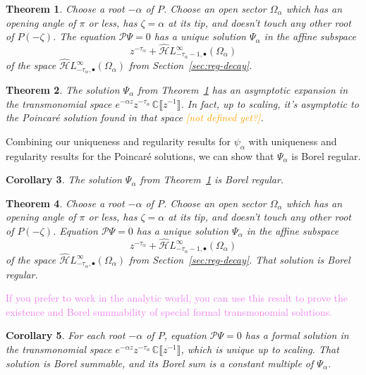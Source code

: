 \documentclass{article}
\newcommand{\dualsingexp}[2]{\widehat{\mathcal{H}}L^\infty_{#1, #2}}
\newcommand{\dualsingexpalg}[1]{\dualsingexp{#1}{\bullet}}
\newcommand{\C}{\mathbb{C}}
\theoremstyle{definition}
\theoremstyle{plain}
\newtheorem{theorem}{Theorem}[section]
\newtheorem{corollary}[theorem]{Corollary}
\begin{document}
\color{BlueViolet}
\begin{theorem}\label{thm:exist_uniq_ODE}
Choose a root $-\alpha$ of $P$. Choose an open sector $\Omega_\alpha$ which has an opening angle of $\pi$ or less, has $\zeta = \alpha$ at its tip, and doesn't touch any other root of $P(-\zeta)$. The equation $\mathcal{P}\Psi = 0$ has a unique solution $\Psi_\alpha$ in the affine subspace
\[ z^{-\tau_\alpha} + \dualsingexpalg{-\tau_\alpha-1}(\Omega_\alpha) \]
of the space $\dualsingexpalg{-\tau_\alpha}(\Omega_\alpha)$ from Section~\ref{sec:reg-decay}.
\end{theorem}
\begin{theorem}\label{thm:has_ae_ODE}
The solution $\Psi_\alpha$ from Theorem~\ref{thm:exist_uniq_ODE} has an asymptotic expansion in the transmonomial space $e^{-\alpha z} z^{-\tau_\alpha}\,\C \llbracket z^{-1} \rrbracket$. In fact, up to scaling, it's asymptotic to the Poincar\'{e} solution found in that space \textcolor{orange}{[not defined yet?]}.
\end{theorem}
Combining our uniqueness and regularity results for $\psi_\alpha$ with uniqueness and regularity results for the Poincar\'{e} solutions, we can show that $\Psi_\alpha$ is Borel regular.
\begin{corollary}
The solution $\Psi_\alpha$ from Theorem~\ref{thm:exist_uniq_ODE} is Borel regular.
\end{corollary}
\color{black}
\color{Maroon}
\begin{theorem}\label{thm:borel_reg_ODE}
Choose a root $-\alpha$ of $P$. Choose an open sector $\Omega_\alpha$ which has an opening angle of $\pi$ or less, has $\zeta = \alpha$ at its tip, and doesn't touch any other root of $P(-\zeta)$. Equation $\mathcal{P}\Psi=0$ has a unique solution $\Psi_\alpha$ in the affine subspace
\[ z^{-\tau_\alpha} + \dualsingexpalg{-\tau_\alpha-1}(\Omega_\alpha) \]
of the space $\dualsingexpalg{-\tau_\alpha}(\Omega_\alpha)$ from Section~\ref{sec:reg-decay}. That solution is Borel regular.
\end{theorem}
\textcolor{violet}{If you prefer to work in the analytic world, you can use this result to prove the existence and Borel summability of special formal transmonomial solutions.}
\begin{corollary}\label{cor:borel_reg_ODE}
For each root $-\alpha$ of $P$, equation $\mathcal{P}\Psi=0$ has a formal solution in the transmonomial space $e^{-\alpha z} z^{-\tau_\alpha}\,\C \llbracket z^{-1} \rrbracket$, which is unique up to scaling. That solution is Borel summable, and its Borel sum is a constant multiple of $\Psi_\alpha$.
\end{corollary}
\end{document}

